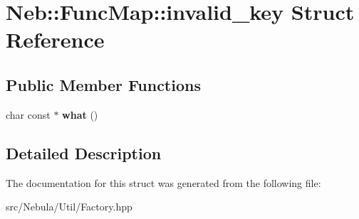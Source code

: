 \hypertarget{structNeb_1_1FuncMap_1_1invalid__key}{\section{\-Neb\-:\-:\-Func\-Map\-:\-:invalid\-\_\-key \-Struct \-Reference}
\label{structNeb_1_1FuncMap_1_1invalid__key}
}
\subsection*{\-Public \-Member \-Functions}
\begin{DoxyCompactItemize}
\item 
\hypertarget{structNeb_1_1FuncMap_1_1invalid__key_a2ad3f4a1a0e503a602a13ddd5fd30f57}{char const $\ast$ {\bfseries what} ()}\label{structNeb_1_1FuncMap_1_1invalid__key_a2ad3f4a1a0e503a602a13ddd5fd30f57}

\end{DoxyCompactItemize}


\subsection{\-Detailed \-Description}


\-The documentation for this struct was generated from the following file\-:\begin{DoxyCompactItemize}
\item 
src/\-Nebula/\-Util/\-Factory.\-hpp\end{DoxyCompactItemize}

